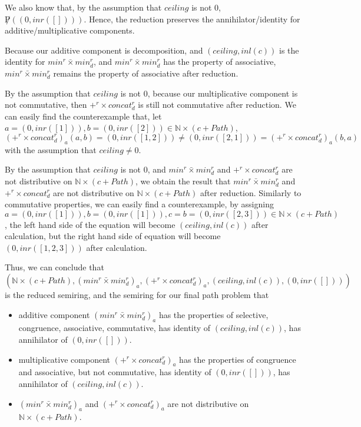 \documentclass[a4paper,12pt,twoside,openright]{report}
\begin{document}
We also know that, by the assumption that $ceiling$ is not 0, $\not P((0,inr([])))$. Hence, the reduction preserves the annihilator/identity for additive/multiplicative components.
 
Because our additive component is decomposition, and $(ceiling,inl (c))$ is the identity for $min^r \bar{\times} min^r_d$, and $min^r \bar{\times} min^r_d$ has the property of associative, $min^r \bar{\times} min^r_d$ remains the property of associative after reduction.

By the assumption that $ceiling$ is not 0, because our multiplicative component is not commutative, then $+^r \times concat^r_d$ is still not commutative after reduction. We can easily find the counterexample that, let $a = (0,inr([1])), b = (0,inr([2])) \in \mathbb{N} \times (c + Path)$, 
\[(+^r \times concat^r_d)_a(a,b) = (0,inr([1,2])) \neq (0,inr([2,1])) = (+^r \times concat^r_d)_a(b,a)\] with the assumption that $ceiling \neq 0$.

By the assumption that $ceiling$ is not 0, and $min^r \bar{\times} min^r_d$ and $+^r \times concat^r_d$ are not distributive on $\mathbb{N} \times (c + Path)$, we obtain the result that $min^r \bar{\times} min^r_d$ and $+^r \times concat^r_d$ are not distributive on $\mathbb{N} \times (c + Path)$ after reduction. Similarly to commutative properties, we can easily find a counterexample, by assigning $a = (0,inr([1])), b = (0,inr([1])), c = b = (0,inr([2,3])) \in \mathbb{N} \times (c + Path)$, the left hand side of the equation will become $(ceiling,inl (c))$ after calculation, but the right hand side of equation will become $(0,inr([1,2,3]))$ after calculation.

Thus, we can conclude that \[(\mathbb{N} \times (c + Path),(min^r \bar{\times} min^r_d)_a,(+^r \times concat^r_d)_a,(ceiling,inl(c)),(0,inr([])))\] is the reduced semiring, and the semiring for our final path problem that 
\begin{itemize}
  \item additive component $(min^r \bar{\times} min^r_d)_a$ has the properties of selective, congruence, associative, commutative, has identity of $(ceiling,inl(c))$, has annihilator of $(0,inr([]))$.
  \item multiplicative component $(+^r \times concat^r_d)_a$ has the properties of congruence and associative, but not commutative, has identity of $(0,inr([]))$, has annihilator of $(ceiling,inl(c))$.
  \item $(min^r \bar{\times} min^r_d)_a$ and $(+^r \times concat^r_d)_a$ are not distributive on $\mathbb{N} \times (c + Path)$.
\end{itemize}
\end{document}
